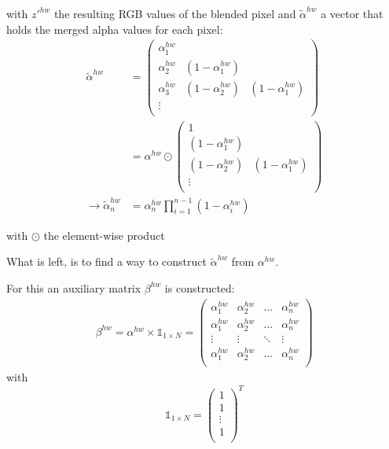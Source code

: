 with $z'^{hw}$ the resulting RGB values of the blended pixel and $\tilde{\alpha}^{hw}$ a vector that holds the merged alpha values for each pixel:
\begin{align}
    \tilde{\alpha}^{hw} & =
    \begin{pmatrix}
        \alpha^{hw}_1 & &\\
        \alpha^{hw}_2 & (1 - \alpha^{hw}_1) &\\
        \alpha^{hw}_3 & (1 - \alpha^{hw}_2) & (1 - \alpha^{hw}_1)\\
        \vdots & &\\
    \end{pmatrix}
    \\
    & = \alpha^{hw} \odot 
    \begin{pmatrix}
        1  &\\
        (1 - \alpha^{hw}_1) &\\
        (1 - \alpha^{hw}_2) & (1 - \alpha^{hw}_1)\\
        \vdots &\\
    \end{pmatrix}
    \\
    \rightarrow  \tilde{\alpha}^{hw}_n & = \alpha^{hw}_n \prod^{n-1}_{i=1} (1 - \alpha^{hw}_i)
\end{align}

with $\odot$ the element-wise product

What is left, is to find a way to construct $\tilde{\alpha}^{hw}$ from $\alpha^{hw}$.

For this an auxiliary matrix $\beta^{hw}$ is constructed:
\begin{align}
    \beta^{hw} = \alpha^{hw} \times \mathbb{1}_{1 \times N} = 
    \begin{pmatrix}
        \alpha^{hw}_1 & \alpha^{hw}_2 & \hdots & \alpha^{hw}_n\\
        \alpha^{hw}_1 & \alpha^{hw}_2 & \hdots & \alpha^{hw}_n\\
        \vdots & \vdots & \ddots & \vdots \\
        \alpha^{hw}_1 & \alpha^{hw}_2 & \hdots & \alpha^{hw}_n\\
    \end{pmatrix}
\end{align}
with
$$
\mathbb{1}_{1 \times N} = \begin{pmatrix}
        1 \\
        1 \\
        \vdots\\
        1 \\
    \end{pmatrix}^T
$$

